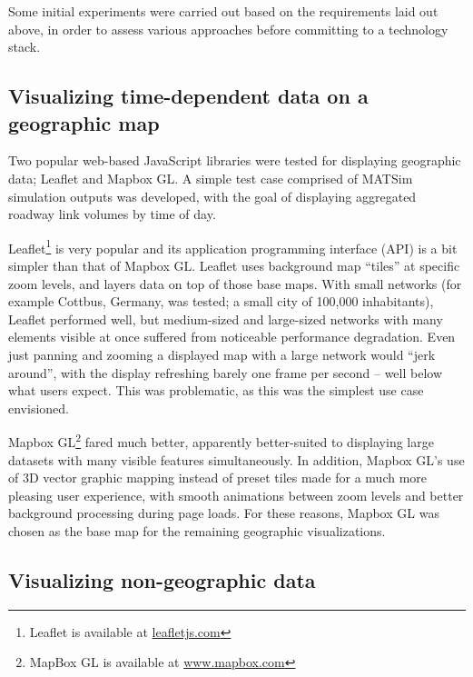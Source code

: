 Some initial experiments were carried out based on the requirements laid out above, in order to assess various approaches before committing to a technology stack.

\hypertarget{mathub-visualizing-time-dependent-data-on-a-geographic-map}{%
\subsection{Visualizing time-dependent data on a geographic
map}\label{visualizing-time-dependent-data-on-a-geographic-map}}

Two popular web-based JavaScript libraries were tested for displaying geographic data; Leaflet and Mapbox GL. A simple test case comprised of MATSim simulation outputs was developed, with the goal of displaying aggregated roadway link volumes by time of day.

Leaflet\footnote{Leaflet is available at \url{leafletjs.com}} is very popular and its application programming interface (API) is a bit simpler than that of Mapbox GL. Leaflet uses background map ``tiles'' at specific zoom levels, and layers data on top of those base maps. With small networks (for example Cottbus, Germany, was tested; a small city of 100,000 inhabitants), Leaflet performed well, but medium-sized and large-sized networks with many elements visible at once suffered from noticeable performance degradation. Even just panning and zooming a displayed map with a large network would ``jerk around'', with the display refreshing barely one frame per second -- well below what users expect. This was problematic, as this was the simplest use case envisioned.

Mapbox GL\footnote{MapBox GL is available at \url{www.mapbox.com}} fared much better, apparently better-suited to displaying large datasets with many visible features simultaneously. In addition, Mapbox GL's use of 3D vector graphic mapping instead of preset tiles made for a much more pleasing user experience, with smooth animations between zoom levels and better background processing during page loads. For these reasons, Mapbox GL was chosen as the base map for the remaining geographic visualizations.

\hypertarget{visualizing-non-geographic-data}{%
\subsection{Visualizing non-geographic data}\label{visualizing-non-geographic-data}}

